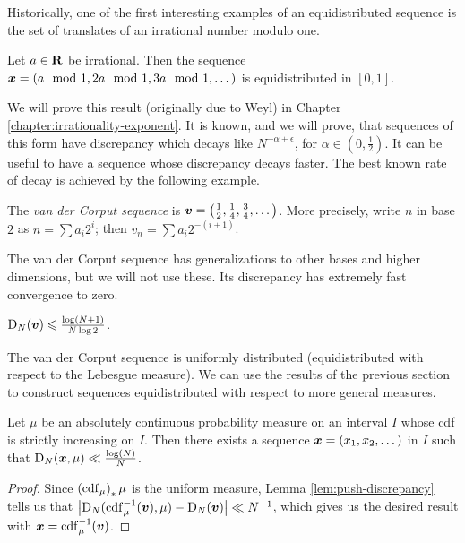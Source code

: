 Historically, one of the first interesting examples of an equidistributed 
sequence is the set of translates  of an irrational number modulo one. 

\begin{theorem}
Let $a\in \mathbf{R}$ be irrational. Then the sequence 
${\boldsymbol x}=(a\mod 1,2a\mod 1,3a\mod 1,\dots)$ is equidistributed in $[0,1]$. 
\end{theorem}

We will prove this result (originally due to Weyl) in Chapter \ref{chapter:irrationality-exponent}. It is known, and we will prove, that 
sequences of this form have discrepancy which decays like 
$N^{-\alpha\pm \epsilon}$, for $\alpha\in \left(0,\frac 1 2\right)$. It can be 
useful to have a sequence whose discrepancy decays faster. The best known rate 
of decay is achieved by the following example. 

\begin{definition}
The \emph{van der Corput sequence} is 
${\boldsymbol v} = \left(\frac 1 2,\frac 1 4,\frac 3 4,\dots\right)$. More precisely, 
write $n$ in base $2$ as $n = \sum a_i 2^i$; then $v_n = \sum a_i 2^{-(i+1)}$. 
\end{definition}

The van der Corput sequence has generalizations to other bases and higher 
dimensions, but we will not use these. Its discrepancy has extremely fast 
convergence to zero. 

\begin{lemma}
$\operatorname{D}_N({\boldsymbol v}) \leqslant \frac{\log(N+1)}{N\log 2}$. 
\end{lemma}

The van der Corput sequence is uniformly distributed (equidistributed with 
respect to the Lebesgue measure). We can use the results of the previous 
section to construct sequences equidistributed with respect to more general 
measures. 

\begin{theorem}\label{thm:van-der-corput}
Let $\mu$ be an absolutely continuous probability measure on an interval $I$  
whose cdf is strictly increasing on $I$. Then there exists a sequence 
${\boldsymbol x}=(x_1,x_2,\dots)$ in $I$ such that $\operatorname{D}_N({\boldsymbol x},\mu) \ll \frac{\log(N)}{N}$. 
\end{theorem}
\begin{proof}
Since $\left(\operatorname{cdf}_\mu\right)_\ast\mu$ is the uniform measure, Lemma 
\ref{lem:push-discrepancy} tells us that 
$\left|\operatorname{D}_N(\operatorname{cdf}_\mu^{-1}({\boldsymbol v}), \mu) - \operatorname{D}_N({\boldsymbol v})\right| \ll N^{-1}$, 
which gives us the desired result with ${\boldsymbol x} = \operatorname{cdf}_\mu^{-1}({\boldsymbol v})$. 
\end{proof}

